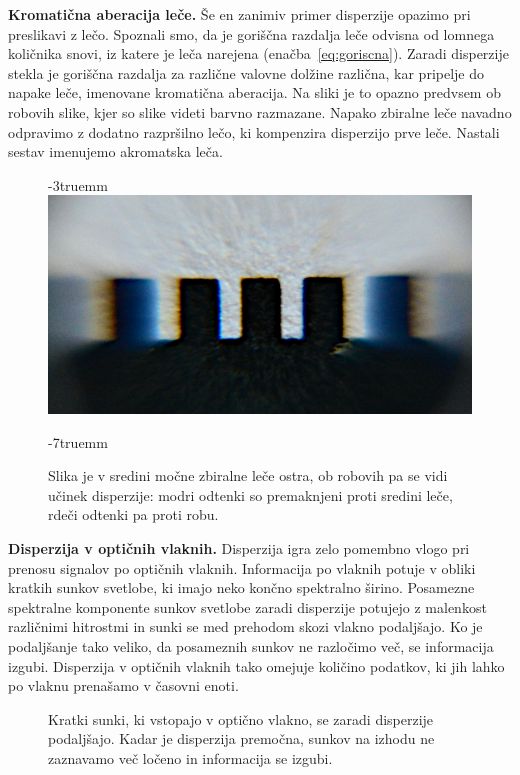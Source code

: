\begin{example}{\bf Kromatična aberacija leče.} Še en zanimiv primer 
disperzije opazimo pri preslikavi z lečo. 
Spoznali smo, da je goriščna razdalja leče odvisna
od lomnega količnika snovi, iz katere je leča narejena 
(enačba~\ref{eq:goriscna}). Zaradi disperzije stekla
je goriščna razdalja za različne valovne dolžine različna,
kar pripelje do napake leče, imenovane kromatična
aberacija. Na sliki je to opazno predvsem 
ob robovih slike, kjer so slike videti barvno razmazane. 
Napako zbiralne leče navadno odpravimo z dodatno razpršilno lečo, ki kompenzira
disperzijo prve leče. Nastali sestav imenujemo akromatska leča.
\begin{figure}[h!]
\vglue-3truemm
\centering
\includegraphics[width=6truecm]{slike/09_aberacija.jpg}
\caption{Slika je v sredini močne zbiralne leče ostra, ob robovih pa
se vidi učinek disperzije: modri odtenki so premaknjeni proti sredini 
leče, rdeči odtenki pa proti robu.}
\label{fig:09_aberacija}
\vglue-7truemm
\end{figure}

\end{example}

\begin{example}{\bf Disperzija v optičnih vlaknih.}
Disperzija igra zelo pomembno vlogo pri prenosu signalov
po optičnih vlaknih. Informacija po vlaknih potuje
v obliki kratkih sunkov svetlobe, ki imajo neko
končno spektralno širino. Posamezne spektralne 
komponente sunkov svetlobe zaradi disperzije 
potujejo z malenkost različnimi hitrostmi in sunki se 
med prehodom skozi vlakno podaljšajo. Ko je podaljšanje
tako veliko, da posameznih sunkov ne razločimo več, 
se informacija izgubi.  
Disperzija v optičnih vlaknih tako omejuje količino 
podatkov, ki jih lahko po vlaknu prenašamo v časovni enoti.
\begin{figure}[ht]
\centering
\def\svgwidth{130truemm} 

\caption{Kratki sunki, ki vstopajo v optično vlakno, se zaradi 
disperzije podaljšajo. Kadar je disperzija premočna, sunkov
na izhodu ne zaznavamo več ločeno in informacija se izgubi.}
\label{fig:09_disperzijafib}
\end{figure}

\end{example}

